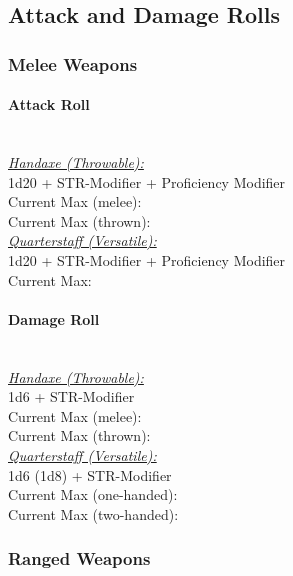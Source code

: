 \documentclass[letterpaper,openany,oneside,twocolumn]{book}
\begin{document}
\subsection*{Attack and Damage Rolls}
\subsubsection*{Melee Weapons}
\paragraph*{Attack Roll}\hfill\\
\underline{\textit{Handaxe (Throwable):}}\\
1d20 + STR-Modifier + Proficiency Modifier\\
\indent Current Max (melee): \\
\indent Current Max (thrown): 
\\
\underline{\textit{Quarterstaff (Versatile):}}\\
1d20 + STR-Modifier + Proficiency Modifier\\
\indent Current Max: 
\paragraph*{Damage Roll}\hfill\\
\underline{\textit{Handaxe (Throwable):}}\\
1d6 + STR-Modifier\\
\indent Current Max (melee): \\
\indent Current Max (thrown): 
\\
\underline{\textit{Quarterstaff (Versatile):}}\\
1d6 (1d8) + STR-Modifier\\
\indent Current Max (one-handed): \\
\indent Current Max (two-handed): 
\subsubsection*{Ranged Weapons}
\end{document}

